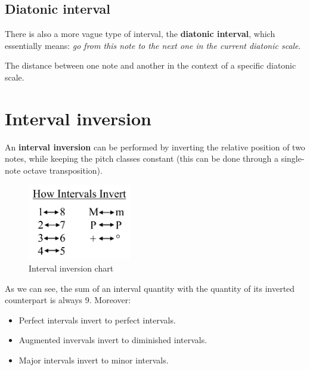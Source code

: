 \subsection{Diatonic interval}
There is also a more vague type of interval, the \textbf{diatonic interval}, which essentially means: \emph{go from this note to the next one in the current diatonic scale}.

\begin{definition}
    The distance between one note and another in the context of a specific diatonic scale.
\end{definition}

\section{Interval inversion}
An \textbf{interval inversion} can be performed by inverting the relative position of two notes, while keeping the pitch classes constant (this can be done through a single-note octave transposition).

\begin{figure}
    \begin{center}
        \includegraphics[width=0.4\textwidth]{img/inversion}
        \caption{Interval inversion chart}
    \end{center}
\end{figure}

As we can see, the sum of an interval quantity with the quantity of its inverted counterpart is always 9. Moreover:
\begin{itemize}
    \item Perfect intervals invert to perfect intervals.
    \item Augmented invervals invert to diminished intervals.
    \item Major intervals invert to minor intervals.
\end{itemize}